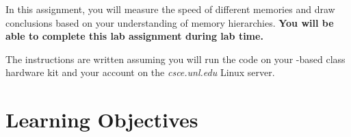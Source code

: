 



\usepackage{graphicx}

\usepackage{xparse}
\usepackage{tikz}
\usetikzlibrary{shadows}
\usepackage{lipsum}


\NewDocumentCommand{}

\renewcommand{\labnumber}{\memorylabnumber}
\renewcommand{\labname}{Memory Measurement Lab}
\renewcommand{\shortlabname}{memorylab}
\renewcommand{\collaborationrules}{\memorylabcollaboration}
\renewcommand{\duedate}{\memorylabdue}
\newcommand{\nano}{\developmentboard} %
\renewcommand{\runtimeenvironment}{your \nano-based class hardware kit and your
account on the \textit{csce.unl.edu} Linux server}
\pagelayout

\labidentifier


In this assignment, you will measure the speed of different memories and draw
conclusions based on your understanding of memory hierarchies. \textbf{You will
be able to complete this lab assignment during lab time.}

The instructions are written assuming you will run the code on
\runtimeenvironment.

\section*{Learning Objectives}

